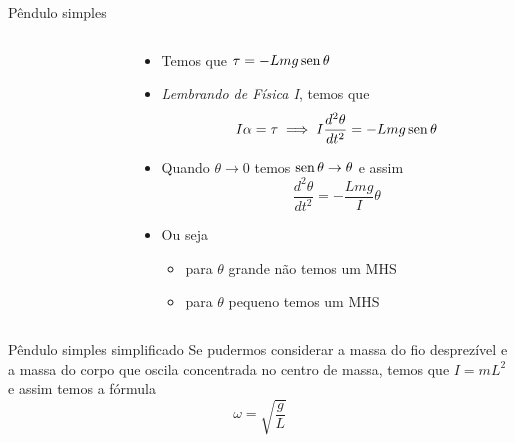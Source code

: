 \begin{frame}{Pêndulo simples}
    \begin{columns}[T]
        \begin{column}{0.4\textwidth}
        \end{column}
        \begin{column}{0.45\textwidth}
            \begin{itemize}
                \item Temos que \(\tau = -Lmg \operatorname{sen}{\theta}\)
                \item \textit{Lembrando de Física I}, temos que
                    \[
                        I\alpha = \tau \implies I\frac{d^2 \theta}{dt^2} = -Lmg\operatorname{sen}{\theta}
                    \]
                \item Quando \(\theta \to 0\) temos \(\operatorname{sen}{\theta} \to \theta\) e assim
                    \[
                        \frac{d^2\theta}{dt^2} = - \frac{Lmg}{I}\theta
                    \]
                \item Ou seja
                    \begin{itemize}
                        \item para \(\theta\) grande não temos um MHS
                        \item para \(\theta\) pequeno temos um MHS
                    \end{itemize}
            \end{itemize}
        \end{column}

    \end{columns}
\end{frame}

\begin{frame}[c]{Pêndulo simples simplificado}
    Se pudermos considerar a massa do fio desprezível e a massa do corpo que oscila concentrada no centro de massa, temos que
    \(I=mL^2\) e assim temos a fórmula
    \[
        \omega = \sqrt{\frac{g}{L}}
    \]
\end{frame}

